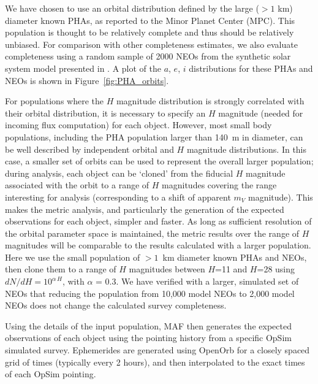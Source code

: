 We have chosen to use an orbital distribution defined by the large ($>1$ km) diameter known PHAs, as reported to the Minor Planet Center (MPC). This population is thought to be relatively complete and thus should be relatively unbiased. For comparison with other completeness estimates, we also evaluate completeness using a random sample of 2000 NEOs from the synthetic solar system model presented in \cite{Grav2011}.  A plot of the $a$, $e$, $i$ distributions for these PHAs and NEOs is shown in Figure~\ref{fig:PHA_orbits}.

For populations where the $H$ magnitude distribution is strongly correlated with their orbital distribution,
it is necessary to specify an $H$ magnitude (needed for incoming flux computation) for each object. However, most small body populations, including the PHA population larger than 140~m in diameter, can be well described by independent orbital and $H$ magnitude distributions. In this case, a smaller set of orbits can be used to represent the overall larger population; during analysis, each object can be `cloned' from the fiducial $H$ magnitude associated with the orbit to a range of $H$ magnitudes covering the range interesting for analysis (corresponding to a shift of apparent $m_V$ magnitude). This makes the metric analysis, and particularly the generation of the expected observations for each object, simpler and faster. As long as sufficient resolution of the orbital parameter space is maintained, the metric results over the range of $H$ magnitudes will be comparable to the results calculated with a larger population. Here we use the small population of $>1$~km diameter known PHAs and NEOs, then clone them to a range of $H$ magnitudes between $H$=11 and $H$=28 using $dN/dH = 10^{\alpha\, H}$, with $\alpha$ = 0.3. We have verified with a larger, simulated set of NEOs that reducing the population from 10,000 model NEOs to 2,000 model NEOs does not change the calculated survey  completeness. 

Using the details of the input population, MAF then generates the expected observations of each object using the pointing history 
from a specific OpSim simulated survey. Ephemerides are generated using OpenOrb \citep{OpenOrb2009} for a closely spaced grid 
of times (typically every 2 hours), and then interpolated to the exact times of each OpSim pointing.


